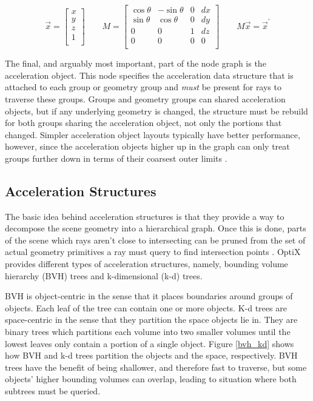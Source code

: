 \begin{equation}
\label{affine}
\vec{x} = \left[ \begin{array}{c}
x \\
y\\
z\\
1 \\ \end{array} 
 \right] \qquad
M = \left[ \begin{array}{cccc}
\cos \theta & -\sin \theta & 0 & dx \\
\sin \theta & \cos \theta & 0 &  dy\\
0 & 0 & 1 & dz\\
0 & 0 & 0 & 0\\
\end{array} \right]  \qquad
M \vec{x} = \vec{x}^\prime
\end{equation}

The final, and arguably most important, part of the node graph is the acceleration object.  This node specifies the acceleration data structure that is attached to each group or geometry group and \emph{must} be present for rays to traverse these groups.  Groups and geometry groups can shared acceleration objects, but if any underlying geometry is changed, the structure must be rebuild for both groups sharing the acceleration object, not only the portions that changed.  Simpler acceleration object layouts typically have better performance, however, since the acceleration objects higher up in the graph can only treat groups further down in terms of their coarsest outer limits \cite{optix}.

\subsection{Acceleration Structures}

The basic idea behind acceleration structures is that they provide a way to decompose the scene geometry into a hierarchical graph.  Once this is done, parts of the scene which rays aren't close to intersecting can be pruned from the set of actual geometry primitives a ray must query to find intersection points \cite{optix}.  OptiX provides different types of acceleration structures, namely, bounding volume hierarchy (BVH) trees and k-dimensional (k-d) trees.

BVH is object-centric in the sense that it places boundaries around groups of objects.  Each leaf of the tree can contain one or more objects. K-d trees are space-centric in the sense that they partition the space objects lie in.  They are binary trees which partitions each volume into two smaller volumes until the lowest leaves only contain a portion of a single object.  Figure \ref{bvh_kd} shows how BVH and k-d trees partition the objects and the space, respectively.  BVH trees have the benefit of being shallower, and therefore fast to traverse, but some objects' higher bounding volumes can overlap, leading to situation where both subtrees must be queried.

